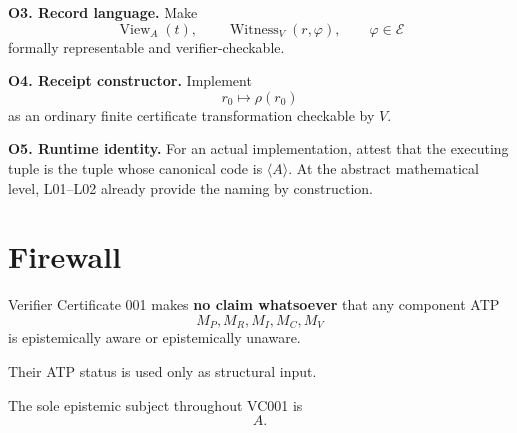 \documentclass[11pt]{article}
\newcommand{\View}{\operatorname{View}}
\newcommand{\Witness}{\operatorname{Witness}}
\begin{document}
\textbf{O3. Record language.} Make
\[
\View_A(t),
\qquad
\Witness_V(r,\varphi),
\qquad
\varphi\in\mathcal E
\]
formally representable and verifier-checkable.

\textbf{O4. Receipt constructor.} Implement
\[
r_0\longmapsto\rho(r_0)
\]
as an ordinary finite certificate transformation checkable by $V$.

\textbf{O5. Runtime identity.} For an actual implementation, attest that the executing tuple is the tuple whose canonical code is $\langle A\rangle$. At the abstract mathematical level, L01--L02 already provide the naming by construction.

\section*{Firewall}

Verifier Certificate 001 makes \textbf{no claim whatsoever} that any component ATP
\[
M_P,M_R,M_I,M_C,M_V
\]
is epistemically aware or epistemically unaware.

Their ATP status is used only as structural input.

The sole epistemic subject throughout VC001 is
\[
\boxed{A}.
\]
\end{document}
